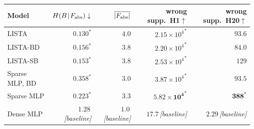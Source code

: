 \begin{tabular}{@{}l rrrr@{}}
\toprule
Model & $H(B\!\mid\!F_{\rm abs})\downarrow$ & $\overline{|F_{\rm abs}|}$ & wrong supp.\ H1\(\uparrow\) & wrong supp.\ H20\(\uparrow\) \\
\midrule
LISTA & ${\mathbf{0.130}}^{\ast}$ & $\mathbf{4.0}$ & ${2.15{\times}10^{4}}^{\ast}$ & $93.6$ \\
LISTA-BD & ${0.156}^{\ast}$ & $3.8$ & ${2.20{\times}10^{4}}^{\ast}$ & $84.0$ \\
LISTA-SB & ${0.153}^{\ast}$ & $3.8$ & ${2.53{\times}10^{4}}^{\ast}$ & $129$ \\
Sparse MLP, BD & ${0.358}^{\ast}$ & $3.0$ & ${3.87{\times}10^{4}}^{\ast}$ & $93.5$ \\
Sparse MLP & ${0.223}^{\ast}$ & $3.3$ & ${\mathbf{5.82{\times}10^{4}}}^{\ast}$ & ${\mathbf{388}}^{\ast}$ \\
Dense MLP & $1.28$\,\emph{[baseline]} & $1.0$\,\emph{[baseline]} & $17.7$\,\emph{[baseline]} & $2.29$\,\emph{[baseline]} \\
\bottomrule
\end{tabular}

